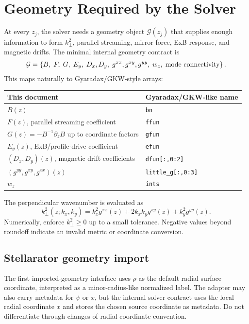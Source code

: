 \documentclass[11pt,a4paper]{article}
\newcommand{\kperp}{k_{\perp}}
\begin{document}
\section{Geometry Required by the Solver}

At every \(z_j\), the solver needs a geometry object \(\mathcal{G}(z_j)\) that supplies enough information to form \(k_\perp^2\), parallel streaming, mirror force, ExB response, and magnetic drifts.  The minimal internal geometry contract is
\begin{equation}
  \mathcal{G} =
  \left\{
  B,\;
  F,\;
  G,\;
  E_y,\;
  D_x,D_y,\;
  g^{xx},g^{xy},g^{yy},\;
  w_z,\;
  \hbox{mode connectivity}
  \right\}.
  \label{eq:geometry-contract}
\end{equation}
This maps naturally to Gyaradax/GKW-style arrays:
\begin{center}
\begin{tabular}{ll}
\toprule
This document & Gyaradax/GKW-like name \\
\midrule
\(B(z)\) & \texttt{bn} \\
\(F(z)\), parallel streaming coefficient & \texttt{ffun} \\
\(G(z) = -B^{-1}\partial_z B\) up to coordinate factors & \texttt{gfun} \\
\(E_y(z)\), ExB/profile-drive coefficient & \texttt{efun} \\
\((D_x,D_y)(z)\), magnetic drift coefficients & \texttt{dfun[:,0:2]} \\
\((g^{yy},g^{xy},g^{xx})(z)\) & \texttt{little\_g[:,0:3]} \\
\(w_z\) & \texttt{ints} \\
\bottomrule
\end{tabular}
\end{center}

The perpendicular wavenumber is evaluated as
\begin{equation}
  \kperp^2(z;k_x,k_y)
  =
  k_x^2 g^{xx}(z)
  +2 k_x k_y g^{xy}(z)
  +k_y^2 g^{yy}(z).
  \label{eq:kperp}
\end{equation}
Numerically, enforce \(\kperp^2\ge 0\) up to a small tolerance.  Negative values beyond roundoff indicate an invalid metric or coordinate conversion.

\subsection{Stellarator geometry import}

The first imported-geometry interface uses \(\rho\) as the default radial
surface coordinate, interpreted as a minor-radius-like normalized label.  The
adapter may also carry metadata for \(\psi\) or \(x\), but the internal solver
contract uses the local radial coordinate \(x\) and stores the chosen source
coordinate as metadata.  Do not differentiate through changes of radial
coordinate convention.
\end{document}
